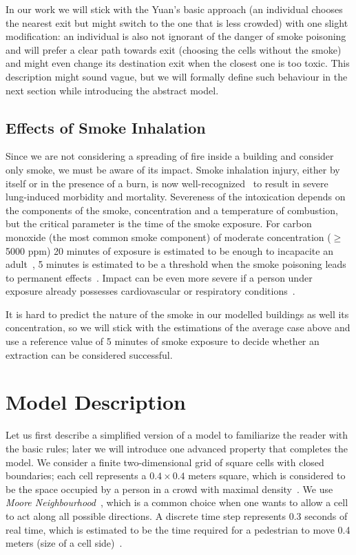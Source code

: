 In our work we will stick with the Yuan's basic approach (an individual chooses
the nearest exit but might switch to the one that is less crowded) with one
slight modification: an individual is also not ignorant of the danger
of smoke poisoning and will prefer a clear path towards exit (choosing the
cells without the smoke) and might even change its destination exit when the
closest one is too toxic.
This description might sound vague, but we will formally define such behaviour
in the next section while introducing the abstract model.

\subsection{Effects of Smoke Inhalation}
Since we are not considering a spreading of fire inside a building and consider
only smoke, we must be aware of its impact. Smoke inhalation injury, either by
itself or in the presence of a burn, is now well-recognized~\cite{NCBI} to
result in severe lung-induced morbidity and mortality.
Severeness of the intoxication depends on the components of the smoke,
concentration and a temperature of combustion, but the critical parameter is
the time of the smoke exposure.
For carbon monoxide (the most common smoke component) of moderate concentration
($\geq$ 5000 ppm) 20 minutes of exposure is estimated to be enough to incapacite
an adult~\cite{CO1}, 5 minutes is estimated to be a threshold when
the smoke poisoning leads to permanent effects~\cite{NCBI, CO2}.
Impact can be even more severe if a person under exposure already possesses
cardiovascular or respiratory conditions~\cite{Inhalation}.

It is hard to predict the nature of the smoke in our modelled buildings as well
its concentration, so we will stick with the estimations of the average case
above and use a reference value of 5 minutes of smoke exposure to decide
whether an extraction can be considered successful.

\section{Model Description}
Let us first describe a simplified version of a model to familiarize the reader with 
the basic rules; later we will introduce one advanced property that completes the 
model.
We consider a finite two-dimensional grid of square cells with closed boundaries; 
each cell represents a $0.4 \times 0.4$ meters square, which is considered to be the 
space occupied by a person in a crowd with maximal
density~\cite{Density1, Density2}.
We use \emph{Moore Neighbourhood}~\cite{Moore}, which is a common choice when one 
wants to allow a cell to act along all possible directions.
A discrete time step represents 0.3 seconds of real time, which is estimated to be 
the time required for a pedestrian to move 0.4 meters
(size of a cell side)~\cite{Density1}.

